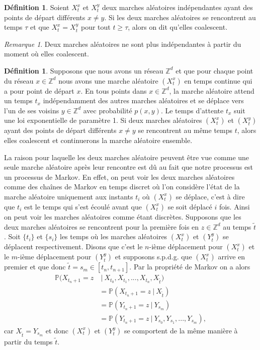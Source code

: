 \documentclass[a4paper,11pt]{article}
\theoremstyle{break}
\theoremstyle{break}
\theoremstyle{definition}
\newtheorem{definition}[theorem]{Définition}
\theoremstyle{remark}
\newtheorem{remarque}[theorem]{Remarque}
\begin{document}
\begin{definition}%
Soient $X^x_t$ et $X^y_t$ deux marches aléatoires indépendantes ayant des points de départ différents $x\neq y$. Si les deux marches aléatoires se rencontrent au temps $\tau$ et que $X^x_t=X^y_t$ pour tout $t\geq \tau$, alors on dit qu'elles coalescent.
\end{definition}

\begin{remarque}
Deux marches aléatoires ne sont plus indépendantes à partir du moment où elles coalescent.
\end{remarque}

\begin{definition}
Supposons que nous avons un réseau $\mathbb{Z}^d$ et que pour chaque point du réseau $x\in\mathbb{Z}^d$ nous avons une marche aléatoire $(X^x_t)$ en temps continue qui a pour point de départ $x$. En tous points dans $x\in \mathbb{Z}^d$, la marche aléatoire attend un temps $t_x$ indépendamment des autres marches aléatoires et se déplace vers l'un de ses voisins $y\in\mathbb{Z}^d$ avec probabilité $p(x,y)$. Le temps d'attente $t_x$ suit une loi exponentielle de paramètre 1. Si deux marches aléatoires $(X^x_t)$ et $(X^y_t)$ ayant des points de départ différents $x\neq y$ se rencontrent au même temps $t$, alors elles coalescent et continuerons la marche aléatoire ensemble.
\end{definition}

La raison pour laquelle les deux marches aléatoire peuvent être vue comme une seule marche aléatoire après  leur rencontre est dû au fait que notre processus est un processus de Markov. En effet, on peut voir les deux marches aléatoires comme des chaînes de Markov en temps discret où l'on considère l'état de la marche aléatoire uniquement aux instants $t_i$ où $(X^x_t)$ se déplace, c'est à dire que $t_i$ est le temps qui s'est écoulé avant que $(X^x_t)$ se soit déplacé $i$ fois. Ainsi on peut voir les marches aléatoires comme étant discrètes. Supposons que les deux marches aléatoires se rencontrent pour la première fois en $z\in\mathbb{Z}^d$ au temps $\tilde{t}$. Soit $\{t_i\}$ et $\{s_i\}$ les temps où les marches aléatoires $(X^x_t)$ et $(Y^y_t)$ se déplacent respectivement. Disons que c'est le $n$-ième déplacement pour $(X^x_t)$ et le $m$-ième déplacement pour $(Y^y_t)$ et supposons s.p.d.g. que $(X^x_t)$ arrive en premier et que donc $\tilde{t}=s_m\in[t_n , t_{n+1}]$. Par la propriété de Markov on a alors
\begin{align*}
\mathbb{P}(X_{t_n+1}=z & \ \vert \ X_{t_0}, X_{t_1},..., X_{t_n}, X_{\tilde{t}})\\
&=\mathbb{P}(X_{t_n+1}=z \ \vert \ X_{\tilde{t}})\\
&=\mathbb{P}(Y_{t_n+1}=z \ \vert \ Y_{s_m})\\
&=\mathbb{P}(Y_{t_n+1}=z \ \vert \ Y_{s_0}, Y_{s_1},..., Y_{s_m}),
\end{align*}
car $X_{\tilde{t}}=Y_{s_m}$ et donc  $(X^x_t)$ et $(Y^y_t)$ se comportent de la même manière à partir du temps $\tilde{t}$.\\
\end{document}
